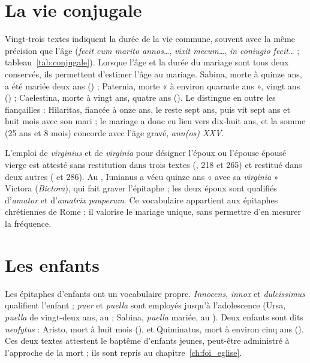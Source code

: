 \section{La vie conjugale}

Vingt-trois textes indiquent la durée de la vie commune, souvent avec la même précision que l’âge (\emph{fecit cum marito annos…}, \emph{vixit mecum…}, \emph{in coniugio fecit…} ; tableau~\ref{tab:conjugale}). Lorsque l’âge et la durée du mariage sont tous deux conservés, ils permettent d’estimer l’âge au mariage. Sabina, morte à quinze ans, a été mariée deux ans () ; Paternia, morte « à environ quarante ans », vingt ans () ; Caelestina, morte à vingt ans, quatre ans (). Le  distingue en outre les fiançailles : Hilaritas, fiancée à onze ans, le reste sept ans, puis vit sept ans et huit mois avec son mari ; le mariage a donc eu lieu vers dix-huit ans, et la somme (25 ans et 8 mois) concorde avec l’âge gravé, \emph{ann(os) XXV}.



L’emploi de \emph{virginius} et de \emph{virginia} pour désigner l’époux ou l’épouse épousé vierge est attesté sans restitution dans trois textes (, 218 et 265) et restitué dans deux autres ( et 286). Au , Iunianus a vécu quinze ans « avec sa \emph{virginia} » Victora (\emph{Bictora}), qui fait graver l’épitaphe ; les deux époux sont qualifiés d’\emph{amator} et d’\emph{amatrix pauperum}. Ce vocabulaire appartient aux épitaphes chrétiennes de Rome ; il valorise le mariage unique, sans permettre d’en mesurer la fréquence.

\section{Les enfants}

Les épitaphes d’enfants ont un vocabulaire propre. \emph{Innocens}, \emph{innox} et \emph{dulcissimus} qualifient l’enfant ; \emph{puer} et \emph{puella} sont employés jusqu’à l’adolescence (Ursa, \emph{puella} de vingt-deux ans, au  ; Sabina, \emph{puella} mariée, au ). Deux enfants sont dits \emph{neofytus} : Aristo, mort à huit mois (), et Quiminatus, mort à environ cinq ans (). Ces deux textes attestent le baptême d’enfants jeunes, peut-être administré à l’approche de la mort ; ils sont repris au chapitre~\ref{ch:foi_eglise}.
